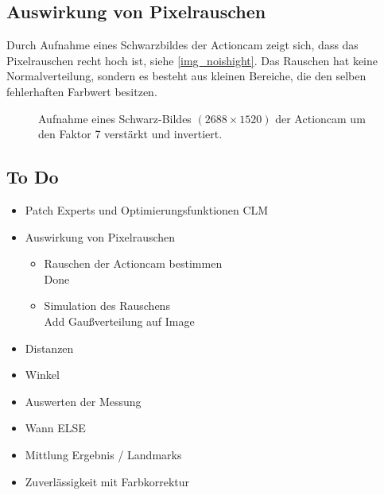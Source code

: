 \subsection{Auswirkung von Pixelrauschen}
Durch Aufnahme eines Schwarzbildes der Actioncam zeigt sich, dass das Pixelrauschen recht hoch ist, siehe \autoref{img_noishight}. Das Rauschen hat keine Normalverteilung, sondern es besteht aus kleinen Bereiche, die den selben fehlerhaften Farbwert besitzen.
\begin{figure}
	\centering
	\caption{Aufnahme eines Schwarz-Bildes $(2688\times 1520)$ der Actioncam um den Faktor 7 verstärkt und invertiert.}
	\label{img_noishight}
\end{figure}

\subsection{To Do}
\begin{itemize}
	\item Patch Experts und Optimierungsfunktionen CLM
	\item Auswirkung von Pixelrauschen
	\begin{itemize}
		\item Rauschen der Actioncam bestimmen\\
		Done
		\item Simulation des Rauschens\\
		Add Gaußverteilung auf Image 
	\end{itemize}
\item Distanzen
\item Winkel
\item Auswerten der Messung
\item Wann ELSE
\item Mittlung Ergebnis / Landmarks
\item Zuverlässigkeit mit Farbkorrektur
\end{itemize}